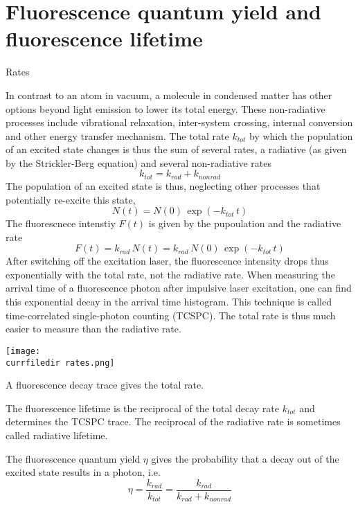 \section{Fluorescence quantum yield and fluorescence lifetime} 


\begin{marginfigure}

  \caption{Rates}
\end{marginfigure}


In contrast to an atom in vacuum, a molecule in condensed matter has other options beyond light emission to lower its total energy. These non-radiative processes include vibrational relaxation, inter-system crossing, internal conversion and other energy transfer mechanism. The total rate $k_{tot}$ by which the population of an excited state changes is thus the sum of several rates, a radiative  (as given by the Strickler-Berg equation) and several non-radiative rates 
\[
 k_{tot} = k_{rad} + k_{non rad} 
\]
%
The population of an excited state is thus, neglecting other processes that  potentially re-excite this state,
\[
 N(t) = N(0) \, \exp \left( - k_{tot}  \,t \right)
\]
The fluorescnece intenstiy $F(t)$ is given by the pupoulation and the radiative rate
\[
 F(t) = k_{rad} \, N(t) = k_{rad} \,  N(0) \, \exp \left( - k_{tot} \, t \right)
\]
After switching off the excitation laser, the fluorescence intensity drops thus exponentially with the total rate, not the radiative rate. When measuring the arrival time of a fluorescence photon after impulsive laser excitation, one can find this exponential decay in the arrival time histogram. This technique is called time-correlated single-photon counting (TCSPC). The total rate is thus much easier to measure than the radiative rate. 


\begin{marginfigure}
   \texttt{[image: \\currfiledir rates.png]}
  \caption{A fluorescence decay trace gives the total rate.}
\end{marginfigure}


The fluorescence lifetime is the reciprocal of the total decay rate $k_{tot}$ and determines the TCSPC trace. The reciprocal of the radiative rate is sometimes called radiative lifetime.

The fluorescence quantum yield $\eta$ gives the probability that a decay out of the excited state results in a photon, i.e.
\[
 \eta   = \frac{k_{rad}}{k_{tot}} = \frac{k_{rad}}{k_{rad} + k_{non rad}}
\]














\printbibliography[segment=\therefsegment,heading=subbibliography]
